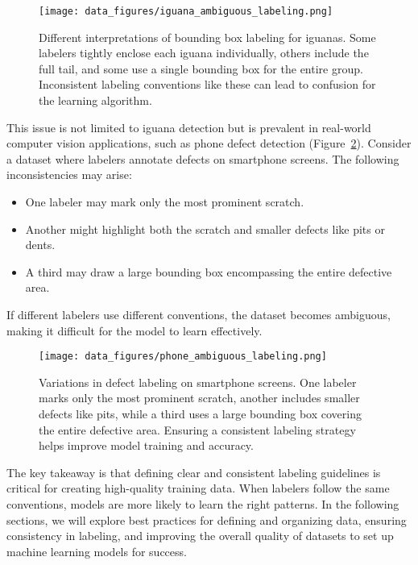 \documentclass[12pt,openany]{book}
\begin{document}
\begin{figure}[H]
    \centering
    \texttt{[image: data\_figures/iguana\_ambiguous\_labeling.png]}
    \caption{Different interpretations of bounding box labeling for iguanas. Some labelers tightly enclose each iguana individually, others include the full tail, and some use a single bounding box for the entire group. Inconsistent labeling conventions like these can lead to confusion for the learning algorithm.}
    \label{fig:iguana_ambiguous_labeling}
\end{figure}

This issue is not limited to iguana detection but is prevalent in real-world computer vision applications, such as phone defect detection (Figure~\ref{fig:phone_ambiguous_labeling}). Consider a dataset where labelers annotate defects on smartphone screens. The following inconsistencies may arise:
\begin{itemize}
    \item One labeler may mark only the most prominent scratch.
    \item Another might highlight both the scratch and smaller defects like pits or dents.
    \item A third may draw a large bounding box encompassing the entire defective area.
\end{itemize}
If different labelers use different conventions, the dataset becomes ambiguous, making it difficult for the model to learn effectively.

\begin{figure}[H]
    \centering
    \texttt{[image: data\_figures/phone\_ambiguous\_labeling.png]}
    \caption{Variations in defect labeling on smartphone screens. One labeler marks only the most prominent scratch, another includes smaller defects like pits, while a third uses a large bounding box covering the entire defective area. Ensuring a consistent labeling strategy helps improve model training and accuracy.}
    \label{fig:phone_ambiguous_labeling}
\end{figure}

The key takeaway is that defining clear and consistent labeling guidelines is critical for creating high-quality training data. When labelers follow the same conventions, models are more likely to learn the right patterns. In the following sections, we will explore best practices for defining and organizing data, ensuring consistency in labeling, and improving the overall quality of datasets to set up machine learning models for success.
\end{document}
